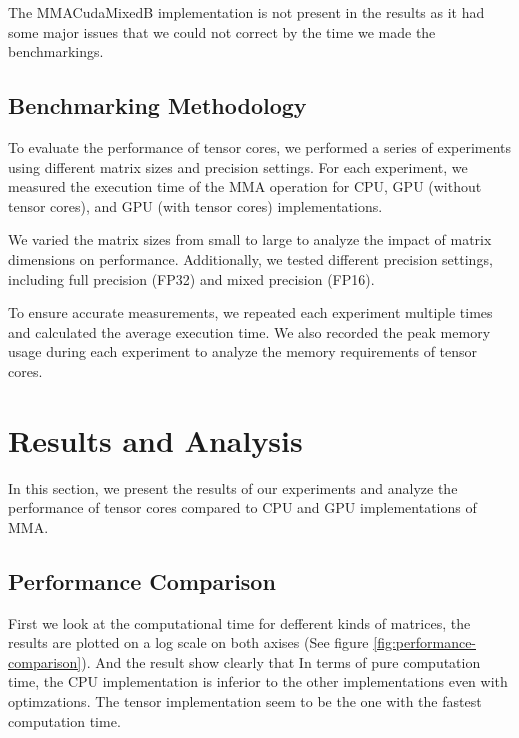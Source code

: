 \documentclass[conference]{IEEEtran}
\begin{document}
  The MMACudaMixedB implementation is not present in the results as it had some major issues that we could
  not correct by the time we made the benchmarkings.

  \subsection{Benchmarking Methodology}\label{sec:benchmarking-methodology}
  
  To evaluate the performance of tensor cores, we performed a series of experiments using different 
  matrix sizes and precision settings. For each experiment, we measured the execution time of the 
  MMA operation for CPU, GPU (without tensor cores), and GPU (with tensor cores) implementations.
  
  We varied the matrix sizes from small to large to analyze the impact of matrix dimensions on 
  performance. Additionally, we tested different precision settings, including full precision (FP32)
  and mixed precision (FP16).
  
  To ensure accurate measurements, we repeated each experiment multiple times and calculated 
  the average execution time. We also recorded the peak memory usage during each experiment to 
  analyze the memory requirements of tensor cores.
  
  \section{Results and Analysis}\label{sec:results-analysis}
  
  In this section, we present the results of our experiments and analyze the performance of 
  tensor cores compared to CPU and GPU implementations of MMA.

  
  \subsection{Performance Comparison}\label{sec:performance-comparison}

  First we look at the computational time for defferent kinds of matrices,
  the results are plotted on a log scale on both axises (See figure \ref{fig:performance-comparison}). And the result show clearly that
  In terms of pure computation time, the CPU implementation is inferior to the other implementations even with optimzations.
  The tensor implementation seem to be the one with the fastest computation time.
\end{document}
